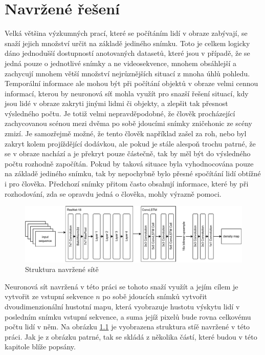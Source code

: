 \chapter{Navržené řešení}
\label{sec:Propesed_solution}

Velká většina výzkumných prací, které se počítáním lidí v obraze zabývají, se snaží jejich množství určit na základě jediného snímku.
Toto je celkem logicky dáno jednodušší dostupností anotovaných datasetů, které jsou v případě, že se jedná pouze o jednotlivé snímky a ne videosekvence, mnohem obsáhlejší a zachycují mnohem větší množství nejrůznějších situací z mnoha úhlů pohledu.
Temporální informace ale mohou být při počítání objektů v obraze velmi cennou informací, kterou by neuronová síť mohla využít pro snazší řešení situací, kdy jsou lidé v obraze zakryti jinými lidmi či objekty, a zlepšit tak přesnost výsledného počtu.
Je totiž velmi nepravděpodobné, že člověk procházející zachycovanou scénou mezi dvěma po sobě jdoucími snímky zničehonic ze scény zmizí.
Je samozřejmě možné, že tento člověk například zašel za roh, nebo byl zakryt kolem projíždějící dodávkou, ale pokud je stále alespoň trochu patrné, že se v obraze nachází a je překryt pouze částečně, tak by měl být do výsledného počtu rozhodně započítán. Pokud by taková situace byla vyhodnocována pouze na základě jediného snímku, tak by nepochybně bylo přesné spočítání lidí obtížné i pro člověka. Předchozí snímky přitom často obsahují informace, které by při rozhodování, zda se opravdu jedná o člověka, mohly výrazně pomoci.

\begin{figure}[h!]
	\centering
	\includegraphics[width=\textwidth]{Figures/solution/net_structure.pdf}
	\caption{Struktura navržené sítě}
	\label{fig:proposed_net}
\end{figure}

Neuronová sít navržená v této práci se tohoto snaží využít a jejím cílem je vytvořit ze vstupní sekvence \(n\) po sobě jdoucích snímků vytvořit dvoudimenzionální hustotní mapu, která vyobrazuje hustotu výskytu lidí v posledním snímku vstupní sekvence, a suma jejíž pixelů bude rovna celkovému počtu lidí v něm. Na obrázku \ref{fig:proposed_net} je vyobrazena struktura stíě navržené v této práci.
Jak je z obrázku patrné, tak se skládá z několika částí, které budou v této kapitole blíže popsány.

